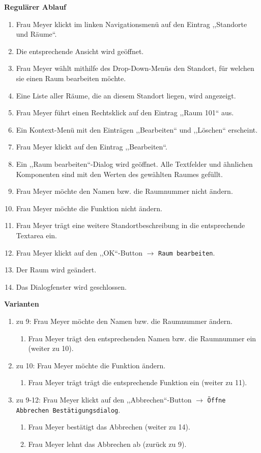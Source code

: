 \documentclass[fontsize=12pt,paper=a4,twoside]{scrartcl}
\begin{document}
\textbf{Regulärer Ablauf}
\begin{enumerate}
\item Frau Meyer klickt im linken Navigationsmenü auf den Eintrag ,,Standorte und Räume``.
\item Die entsprechende Ansicht wird geöffnet.
\item Frau Meyer wählt mithilfe des Drop-Down-Menüs den Standort, für welchen sie einen Raum bearbeiten möchte.
\item Eine Liste aller Räume, die an diesem Standort liegen, wird angezeigt.
\item Frau Meyer führt einen Rechtsklick auf den Eintrag ,,Raum 101`` aus.
\item Ein Kontext-Menü mit den Einträgen ,,Bearbeiten`` und ,,Löschen`` erscheint.
\item Frau Meyer klickt auf den Eintrag ,,Bearbeiten``.
\item Ein ,,Raum bearbeiten``-Dialog wird geöffnet. Alle Textfelder und ähnlichen Komponenten sind mit den Werten des gewählten Raumes gefüllt.
\item Frau Meyer möchte den Namen bzw. die Raumnummer nicht ändern.
\item Frau Meyer möchte die Funktion nicht ändern.
\item Frau Meyer trägt eine weitere Standortbeschreibung in die entsprechende Textarea ein.
\item Frau Meyer klickt auf den ,,OK``-Button $\rightarrow$ \texttt{Raum bearbeiten}.
\item Der Raum wird geändert.
\item Das Dialogfenster wird geschlossen.
\end{enumerate}
\vspace{5pt}

\textbf{Varianten}
\begin{enumerate}
\item zu 9: Frau Meyer möchte den Namen bzw. die Raumnummer ändern.
	\begin{enumerate}[label={\alph*.}]
	\item Frau Meyer trägt den entsprechenden Namen bzw. die Raumnummer ein (weiter zu 10). 
	\end{enumerate}
\item zu 10: Frau Meyer möchte die Funktion ändern.
	\begin{enumerate}[label={\alph*.}]
	\item Frau Meyer trägt trägt die entsprechende Funktion ein (weiter zu 11). 
	\end{enumerate}
\item zu 9-12: Frau Meyer klickt auf den ,,Abbrechen``-Button $\rightarrow$ \texttt{Öffne Abbrechen Bestätigungsdialog}.
	\begin{enumerate}[label={\alph*.}]
	\item Frau Meyer bestätigt das Abbrechen (weiter zu 14).
	\item Frau Meyer lehnt das Abbrechen ab (zurück zu 9).
	\end{enumerate}
\end{enumerate}
\vspace{5pt}
\end{document}
